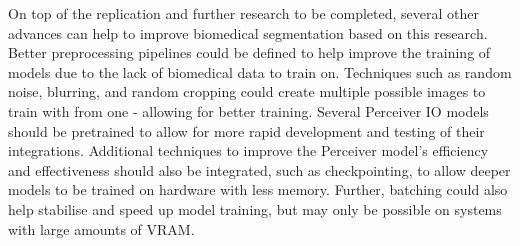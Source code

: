 \documentclass{l4proj}
\begin{document}
On top of the replication and further research to be completed, several other advances can help to improve biomedical segmentation based on this research. Better preprocessing pipelines could be defined to help improve the training of models due to the lack of biomedical data to train on. Techniques such as random noise, blurring, and random cropping could create multiple possible images to train with from one - allowing for better training. Several Perceiver IO models should be pretrained to allow for more rapid development and testing of their integrations. Additional techniques to improve the Perceiver model’s efficiency and effectiveness should also be integrated, such as checkpointing, to allow deeper models to be trained on hardware with less memory. Further, batching could also help stabilise and speed up model training, but may only be possible on systems with large amounts of VRAM.

%
% 
\end{document}
